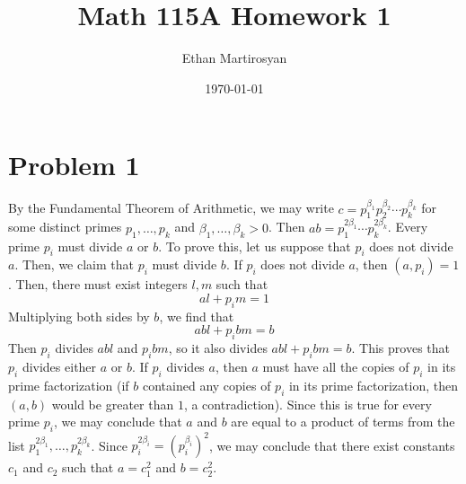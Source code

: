 \documentclass[12pt]{article}
\begin{document}
 
\title{Math 115A Homework 1}
\author{Ethan Martirosyan}
\date{\today}
\maketitle
{}
\hfuzz=50pt
\section*{Problem 1}
By the Fundamental Theorem of Arithmetic, we may write $c = p_1^{\beta_1}p_2^{\beta_2}\cdots p_k^{\beta_k}$ for some distinct primes $p_1,\ldots,p_k$ and $\beta_1,\ldots,\beta_k > 0$. Then $ab = p_1^{2\beta_1} \cdots p_k^{2\beta_k}$. Every prime $p_i$ must divide $a$ or $b$. To prove this, let us suppose that $p_i$ does not divide $a$. Then, we claim that $p_i$ must divide $b$. If $p_i$ does not divide $a$, then $(a,p_i) = 1$. Then, there must exist integers $l,m$ such that
\[
al + p_im = 1
\] Multiplying both sides by $b$, we find that
\[
abl + p_ibm = b
\] Then $p_i$ divides $abl$ and $p_ibm$, so it also divides $abl + p_ibm = b$. This proves that $p_i$ divides either $a$ or $b$. If $p_i$ divides $a$, then $a$ must have all the copies of $p_i$ in its prime factorization (if $b$ contained any copies of $p_i$ in its prime factorization, then $(a,b)$ would be greater than $1$, a contradiction). Since this is true for every prime $p_i$, we may conclude that $a$ and $b$ are equal to a product of terms from the list $p_1^{2\beta_1}, \ldots, p_k^{2\beta_k}$. Since $p_i^{2 \beta_i} = (p_i^{\beta_i})^2$, we may conclude that there exist constants $c_1$ and $c_2$ such that $a = c_1^2$ and $b = c_2^2$.
\newpage
\end{document}
